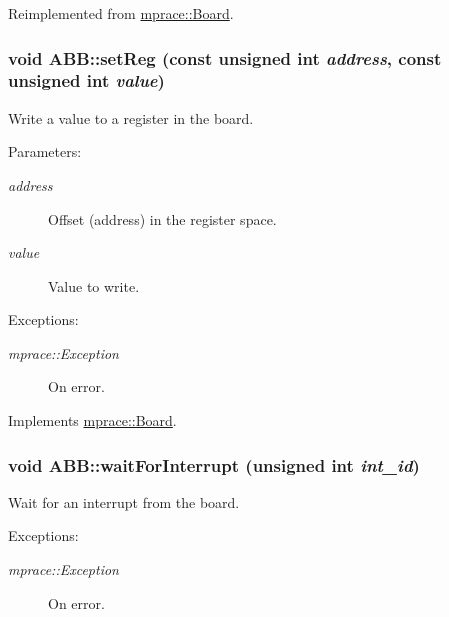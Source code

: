 Reimplemented from \hyperlink{classmprace_1_1Board_a8}{mprace::Board}.\hypertarget{classmprace_1_1ABB_a2}{
\subsubsection[setReg]{\setlength{\rightskip}{0pt plus 5cm}void ABB::set\-Reg (const unsigned int {\em address}, const unsigned int {\em value})}}
\label{classmprace_1_1ABB_a2}


Write a value to a register in the board. 

\begin{Desc}
\item[Parameters:]
\begin{description}
\item[{\em address}]Offset (address) in the register space. \item[{\em value}]Value to write. \end{description}
\end{Desc}
\begin{Desc}
\item[Exceptions:]
\begin{description}
\item[{\em mprace::Exception}]On error.\end{description}
\end{Desc}


Implements \hyperlink{classmprace_1_1Board_a1}{mprace::Board}.\hypertarget{classmprace_1_1ABB_a15}{
\subsubsection[waitForInterrupt]{\setlength{\rightskip}{0pt plus 5cm}void ABB::wait\-For\-Interrupt (unsigned int {\em int\_\-id})}}
\label{classmprace_1_1ABB_a15}


Wait for an interrupt from the board. 

\begin{Desc}
\item[Exceptions:]
\begin{description}
\item[{\em mprace::Exception}]On error.\end{description}
\end{Desc}


